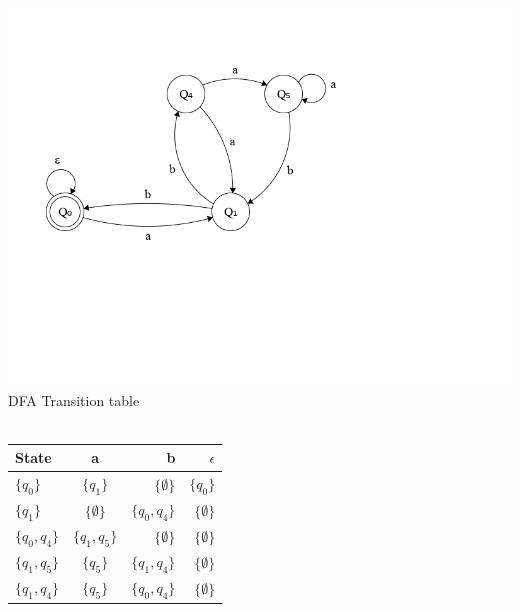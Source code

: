 \documentclass{article}
\begin{document}
\begin{enumerate}
			\includegraphics[width=\textwidth]{p2_6.png}\\

      DFA Transition table\\\\
      \begin{tabular}{ l | c | r | r }
        State & a & b & $\epsilon$ \\ \hline
        $\{q_0\}$ & $\{q_1\}$ & $\{\emptyset\}$ & $\{q_0\}$ \\

        $\{q_1\}$ & $\{\emptyset\}$ & $\{q_0, q_4\}$ & $\{\emptyset\}$\\

        $\{q_0, q_4\}$ & $\{q_1, q_5\}$ & $\{\emptyset\}$ & $\{\emptyset\}$ \\

        $\{q_1, q_5\}$ & $\{q_5\}$ & $\{q_1, q_4\}$ & $\{\emptyset\}$ \\

        $\{q_1, q_4\}$ & $\{q_5\}$ & $\{q_0, q_4\}$ & $\{\emptyset\}$ \\

      \end{tabular}


\end{enumerate}
\end{document}
